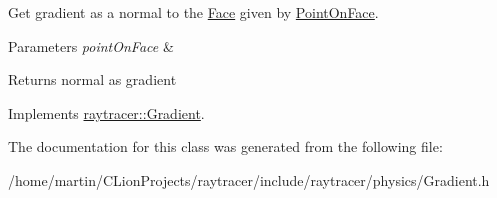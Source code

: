 Get gradient as a normal to the \hyperlink{classraytracer_1_1Face}{Face} given by \hyperlink{structraytracer_1_1PointOnFace}{Point\+On\+Face}. 


\begin{DoxyParams}{Parameters}
{\em point\+On\+Face} & \\
\hline
\end{DoxyParams}
\begin{DoxyReturn}{Returns}
normal as gradient 
\end{DoxyReturn}


Implements \hyperlink{classraytracer_1_1Gradient_a93ccfef0662634c5f9a3c8dd04e73496}{raytracer\+::\+Gradient}.



The documentation for this class was generated from the following file\+:\begin{DoxyCompactItemize}
\item 
/home/martin/\+C\+Lion\+Projects/raytracer/include/raytracer/physics/Gradient.\+h\end{DoxyCompactItemize}
